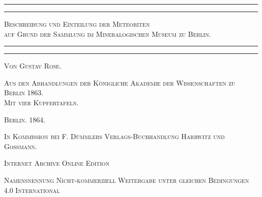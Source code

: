 \documentclass[a4paper, 11pt, oneside]{article}
\begin{document}
\begin{titlepage} %
	\centering %

	
	\rule{\textwidth}{1.6pt}\vspace*{-\baselineskip}\vspace*{2pt} %
	\rule{\textwidth}{0.4pt} %
	
	\vspace{1.5\baselineskip} %
	
	{\scshape\LARGE Beschreibung und Einteilung der Meteoriten\\auf Grund der Sammlung im Mineralogischen Museum zu Berlin.}
	
	\vspace{1\baselineskip} %

	\rule{\textwidth}{0.4pt}\vspace*{-\baselineskip}\vspace{3.2pt} %
	\rule{\textwidth}{1.6pt} %
	
	\vspace{1\baselineskip} %
	
	
	{\scshape Von Gustav Rose.} %
	
	\vspace*{1\baselineskip} %
	
    {\scshape\small Aus den Abhandlungen der Königliche Akademie der Wissenschaften zu Berlin 1863.\\Mit vier Kupfertafeln.} %
    
    \vspace*{\fill}

	\vspace{1\baselineskip}

	{\small\scshape Berlin. 1864.}
	
	{\small\scshape{In Kommission bei F. Dümmlers Verlags-Buchhandlung Harrwitz und Gossmann.}}
	
	\vspace{0.5\baselineskip} %

    \scshape Internet Archive Online Edition  %
	
	{\scshape\small Namensnennung Nicht-kommerziell Weitergabe unter gleichen Bedingungen 4.0 International} %
\end{titlepage}
\setlength{\parskip}{1mm plus1mm minus1mm}
\clearpage
\tableofcontents
\clearpage
\end{document}
